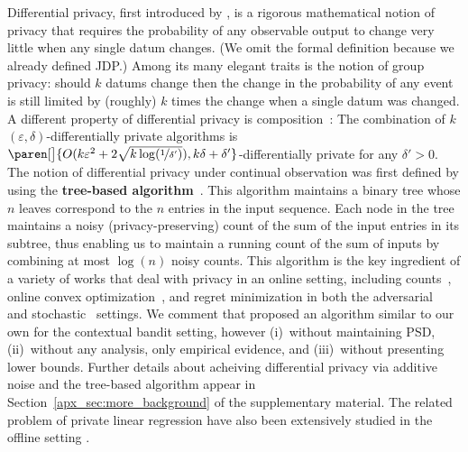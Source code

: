 \documentclass{article}
\DeclarePairedDelimiter{\paren}()
\renewcommand{\paragraph}[1]{\vspace{2pt}\noindent\textbf{#1}}
\begin{document}
Differential privacy, first introduced by
\citet{DworkCalibratingNoiseSensitivity2006,DworkOurData2006}, is a
rigorous mathematical notion of privacy that requires the probability
of any observable output to change very little when any single datum
changes.  (We omit the formal definition because we already defined JDP.)
Among its many elegant traits is the notion of group privacy: should
$k$ datums change then the change in the probability of any event is
still limited by (roughly) $k$ times the change when a single datum
was changed.  A different property of differential privacy is composition~\cite{DworkBoosting2010}: The combination of $k$ $(\varepsilon,\delta)$-differentially private algorithms is $\paren[\big]{O(k\varepsilon^2 + 2\sqrt{k\log(\nicefrac 1 {\delta'})}), k\delta+\delta'}$-differentially private for any $\delta'>0$.
%
The notion of differential privacy under continual observation was
first defined by \citet{DworkContinualObservation2010} using the \textbf{tree-based algorithm}~\citep[originally
appearing in][]{ChanPrivateContinualRelease2010}. This algorithm
maintains a binary tree whose $n$ leaves correspond to the $n$ entries
in the input sequence. Each node in the tree maintains a noisy
(privacy-preserving) count of the sum of the input entries in its
subtree, thus enabling us to maintain a running count of the sum of
inputs by combining at most $\log(n)$ noisy counts. This
algorithm is the key ingredient of a variety of works that deal with
privacy in an online setting, including
counts~\cite{DworkContinualObservation2010}, online convex
optimization~\cite{JainDPOnlineLearning2012}, and regret minimization
in both the
adversarial~\citep{SmithThakurtaPrivateOnlineLearning2013,TossouAchievingPrivacyAdversarial2017}
and
stochastic~\cite{MishraNearlyOptimalDPBandits2015,TossouAlgDPBandits2016}
settings. We comment that \citet{MishraNearlyOptimalDPBandits2015}
proposed an algorithm similar to our own for the contextual bandit
setting, however (i)~without maintaining PSD, (ii)~without any
analysis, only empirical evidence, and (iii)~without presenting lower
bounds. Further details about acheiving differential privacy via additive noise and the tree-based algorithm appear in Section~\ref{apx_sec:more_background} of the supplementary material.
%
The related problem of private linear regression have also been extensively studied in the offline setting
\citep{ChaudhuriDPERM2011,BassilyPrivateEmpiricalRisk2014}.
\end{document}
